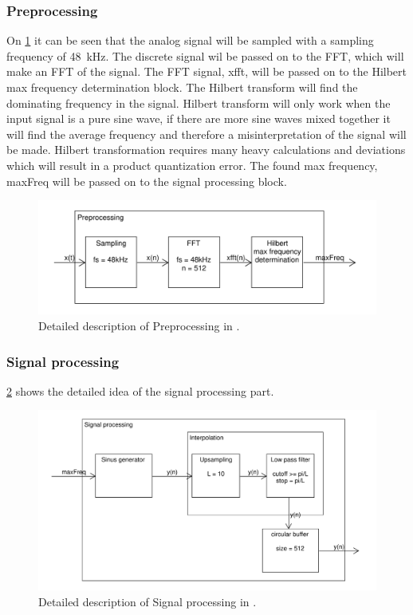 \subsubsection{Preprocessing}
On \cref{fig:DetailedPrePro} it can be seen that the analog signal will be sampled with a sampling frequency of \SI{48}{\kilo\hertz}.
The discrete signal wil be passed on to the FFT, which will make an FFT of the signal.
The FFT signal, xfft, will be passed on to the Hilbert max frequency determination block.
The Hilbert transform will find the dominating frequency in the signal.
Hilbert transform will only work when the input signal is a pure sine wave, if there are more sine waves mixed together it will find the average frequency and therefore a misinterpretation of the signal will be made.
Hilbert transformation requires many heavy calculations and deviations which will result in a product quantization error.
The found max frequency, maxFreq will be passed on to the signal processing block.

\begin{figure}
	\centering
	\includegraphics[width=1\linewidth]{gfx/Design/DesignPrePro_IF.pdf}
	\caption{Detailed description of Preprocessing in \systemName.}
	\label{fig:DetailedPrePro}
\end{figure}

\subsubsection{Signal processing}
\cref{fig:DetailedSigPro} shows the detailed idea of the signal processing part.

\begin{figure}
	\centering
	\includegraphics[width=1\linewidth]{gfx/Design/DesignSigPro_IF.pdf}
	\caption{Detailed description of Signal processing in \systemName.}
	\label{fig:DetailedSigPro}
\end{figure}

